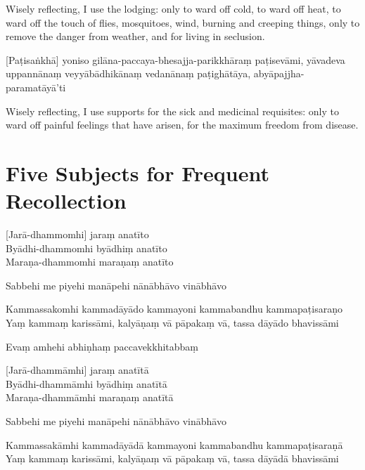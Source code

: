 \begin{english}
  Wisely reflecting, I use the lodging: only to ward off cold, to ward off heat,
  to ward off the touch of flies, mosquitoes, wind, burning and creeping things,
  only to remove the danger from weather, and for living in seclusion.
\end{english}

[Paṭisaṅkhā] yoniso gilāna-paccaya-bhesajja-parikkhāraṃ paṭisevāmi, yāvadeva
uppannānaṃ veyyābādhikānaṃ vedanānaṃ paṭighātāya, abyāpajjha-paramatāyā'ti

\begin{english}
  Wisely reflecting, I use supports for the sick and medicinal requisites: only
  to ward off painful feelings that have arisen, for the maximum freedom from
  disease.
\end{english}


\section{Five Subjects for Frequent Recollection}

\begin{leader}
\end{leader}



[Jarā-dhammomhi] jaraṃ anatīto\\
Byādhi-dhammomhi byādhiṃ anatīto\\
Maraṇa-dhammomhi maraṇaṃ anatīto

Sabbehi me piyehi manāpehi nānābhāvo vinābhāvo

Kammassakomhi kammadāyādo kammayoni kammabandhu kammapaṭisaraṇo\\
Yaṃ kammaṃ karissāmi, kalyāṇaṃ vā pāpakaṃ vā, tassa dāyādo bhavissāmi

Evaṃ amhehi abhiṇhaṃ paccavekkhitabbaṃ


[Jarā-dhammāmhi] jaraṃ anatītā\\
Byādhi-dhammāmhi byādhiṃ anatītā\\
Maraṇa-dhammāmhi maraṇaṃ anatītā

Sabbehi me piyehi manāpehi nānābhāvo vinābhāvo

Kammassakāmhi kammadāyādā kammayoni kammabandhu kammapaṭisaraṇā\\
Yaṃ kammaṃ karissāmi, kalyāṇaṃ vā pāpakaṃ vā, tassa dāyādā bhavissāmi

